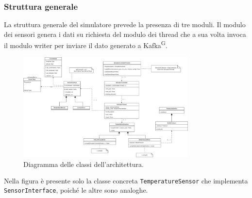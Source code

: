 \documentclass[8pt]{article}
\newcommand{\glossterm}[1]{#1\textsuperscript{G}} %
\begin{document}
\subsubsection{Struttura generale}
La struttura generale del simulatore prevede la presenza di tre moduli. Il modulo dei sensori genera i dati su richiesta del modulo dei thread che a sua volta invoca il modulo writer per inviare il dato generato a \glossterm{Kafka}.
\begin{figure}[h!]
    \centering
    \includegraphics[width=0.8\textwidth]{images_st/overview.png}
    \caption{Diagramma delle classi dell'architettura.}
    \label{fig:Diagramma delle classi dell'architettura}
\end{figure}
Nella figura è presente solo la classe concreta \verb|TemperatureSensor| che implementa \verb|SensorInterface|, poiché le altre sono analoghe.
\end{document}
